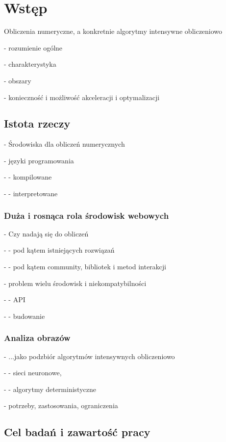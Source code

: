\chapter{Wstęp}

Obliczenia numeryczne, a konkretnie algorytmy intensywne obliczeniowo

- rozumienie ogólne

- charakterystyka

- obszary

- konieczność i możliwość akceleracji i optymalizacji

\section{Istota rzeczy}

- Środowiska dla obliczeń numerycznych

- języki programowania

- - kompilowane

- - interpretowane

\subsection{Duża i rosnąca rola środowisk webowych}

- Czy nadają się do obliczeń

- - pod kątem istniejących rozwiązań

- - pod kątem community, bibliotek i metod interakcji

- problem wielu środowisk i niekompatybilności

- - API

- - budowanie


\subsection{Analiza obrazów}

- ...jako podzbiór algorytmów intensywnych obliczeniowo

- - sieci neuronowe,

- - algorytmy deterministyczne

- potrzeby, zastosowania, ograniczenia

\section{Cel badań i zawartość pracy}
